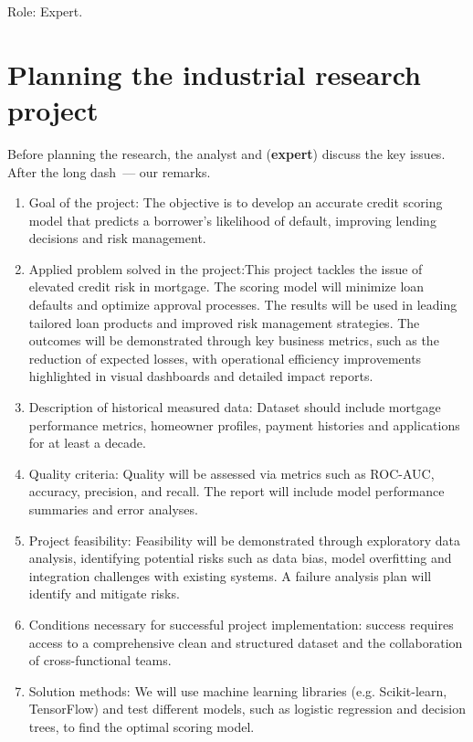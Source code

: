 \documentclass[12pt]{article}
\date{}
\begin{document}
\maketitle

 Role: Expert.


\section{Planning the industrial research project}
Before planning the research, the analyst and (\textbf{expert}) discuss the key issues. After the long dash~--- our remarks.

\begin{enumerate}
\item Goal of the project: The objective is to develop an accurate credit scoring model that predicts a borrower’s likelihood of default, improving lending decisions and risk management.
\item Applied problem solved in the project:This project tackles the issue of elevated credit risk in mortgage. The scoring model will minimize loan defaults and optimize approval processes. The results will be used in leading tailored loan products and improved risk management strategies. The outcomes will be demonstrated through key business metrics, such as the reduction of expected losses, with operational efficiency improvements highlighted in visual dashboards and detailed impact reports.
\item Description of historical measured data: Dataset should include mortgage performance metrics, homeowner profiles, payment histories and applications for at least a decade.
\item Quality criteria: Quality will be assessed via metrics such as ROC-AUC, accuracy, precision, and recall. The report will include model performance summaries and error analyses.
\item Project feasibility: Feasibility will be demonstrated through exploratory data analysis, identifying potential risks such as data bias, model overfitting and integration challenges with existing systems. A failure analysis plan will identify and mitigate risks.
\item Conditions necessary for successful project implementation: success requires access to a comprehensive clean and structured dataset and the collaboration of cross-functional teams.
\item Solution methods: We will use machine learning libraries (e.g. Scikit-learn, TensorFlow) and test different models, such as logistic regression and decision trees, to find the optimal scoring model.
\end{enumerate}
\end{document}
